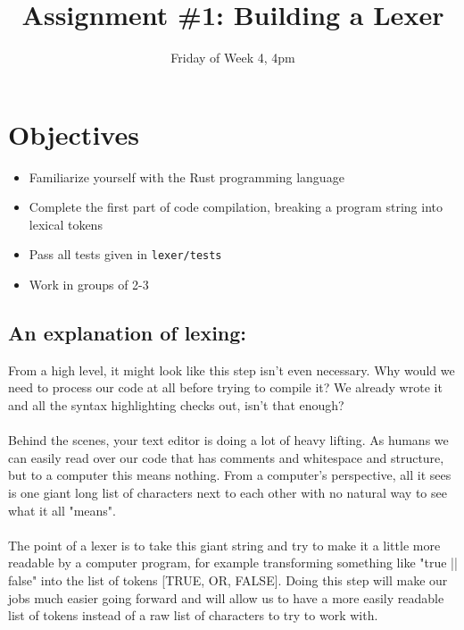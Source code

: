 \documentclass[
	12pt, %
]{fphw}
\title{Assignment \#1: Building a Lexer} %
\date{Friday of Week 4, 4pm} %
\institute{Union College} %
\newcommand{\code}[1]{%
  \lstinline[basicstyle=\footnotesize\ttfamily]$#1$%
}
\begin{document}
\maketitle %


\section*{Objectives}

\begin{problem}
	\begin{itemize}
	    \item Familiarize yourself with the Rust programming language
        \item Complete the first part of code compilation, breaking a program string into lexical tokens
        \item Pass all tests given in \code{lexer/tests}
        \item Work in groups of 2-3
        
	\end{itemize}
\end{problem}


\subsection*{An explanation of lexing:}
From a high level, it might look like this step isn't even necessary. Why would we need to process our code at all before trying to compile it? We already wrote it and all the syntax highlighting checks out, isn't that enough? \\
\\
Behind the scenes, your text editor is doing a lot of heavy lifting. As humans we can easily read over our code that has comments and whitespace and structure, but to a computer this means nothing. From a computer's perspective, all it sees is one giant long list of characters next to each other with no natural way to see what it all "means".\\
\\
The point of a lexer is to take this giant string and try to make it a little
more readable by a computer program, for example transforming something like
"true || false" into the list of tokens [TRUE, OR, FALSE]. Doing this step will
make our jobs much easier going forward and will allow us to have a more easily
readable list of tokens instead of a raw list of characters to try to work with.
\end{document}
